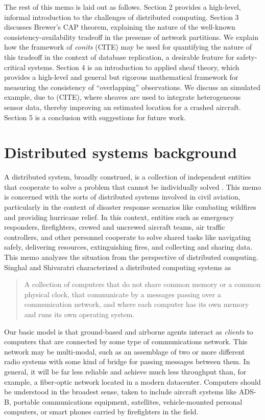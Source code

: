 The rest of this memo is laid out as follows. Section 2 provides a
high-level, informal introduction to the challenges of distributed
computing. Section 3 discusses Brewer's CAP theorem, explaining the
nature of the well-known consistency-availability tradeoff in the
presense of network partitions. We explain how the framework of
\emph{conits} (CITE) may be used for quantifying the nature of this
tradeoff in the context of database replication, a desirable feature
for safety-critical systems. Section 4 is an introduction to applied
sheaf theory, which provides a high-level and general but rigorous
mathematical framework for measuring the consistency of
``overlapping'' observations. We discuss an simulated example, due to
(CITE), where sheaves are used to integrate heterogeneous sensor data,
thereby improving an estimated location for a crashed
aircraft. Section 5 is a conclusion with suggestions for future work.

\section{Distributed systems background}
A distributed system, broadly construed, is a collection of
independent entities that cooperate to solve a problem that cannot be
individually solved \cite{kshemkalyani_singhal_2008}. This memo is
concerned with the sorts of distributed systems involved in civil
aviation, particularly in the context of disaster response scenarios
like combating wildfires and providing hurricane relief. In this
context, entities such as emergency responders, firefighters, crewed
and uncrewed aircraft teams, air traffic controllers, and other
personnel cooperate to solve shared tasks like navigating safely,
delivering resources, extinguishing fires, and collecting and sharing
data. This memo analyzes the situation from the perspective of
distributed computing. Singhal and Shivaratri \cite{10.5555/562065} characterized a
distributed computing systems as
\begin{quotation}
   A collection of computers that do not share common memory or a common
   physical clock, that communicate by a messages passing over a communication
   network, and where each computer has its own memory and runs its own
   operating system.
\end{quotation}
Our basic model is that ground-based and airborne agents interact as
\emph{clients} to computers that are connected by some type of
communications network. This network may be multi-modal, such as an
assemblage of two or more different radio systems with some kind of
bridge for passing messages between them. In general, it will be far
less reliable and achieve much less throughput than, for example, a
fiber-optic network located in a modern datacenter. Computers should
be understood in the broadest sense, taken to include aircraft systems
like ADS-B, portable communications equipment, satellites,
vehicle-mounted personal computers, or smart phones carried by
firefighters in the field.

